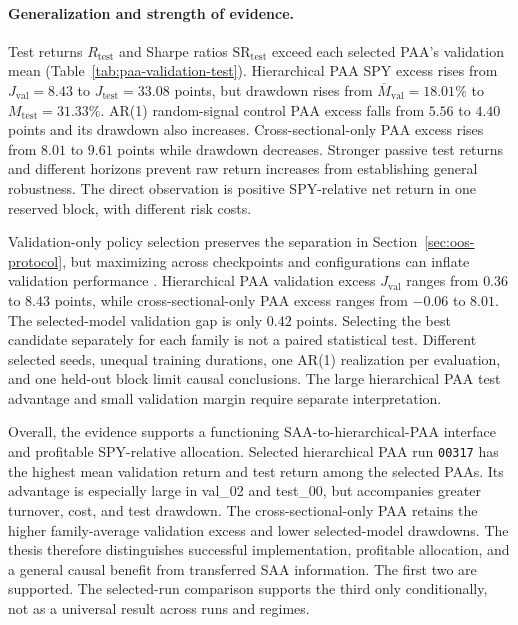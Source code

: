 \paragraph{Generalization and strength of evidence.}
Test returns \(R_{\mathrm{test}}\) and Sharpe ratios \(\mathrm{SR}_{\mathrm{test}}\) exceed each selected PAA's validation mean (Table~\ref{tab:paa-validation-test}). Hierarchical PAA SPY excess rises from \(J_{\mathrm{val}}=8.43\) to \(J_{\mathrm{test}}=33.08\) points, but drawdown rises from \(\overline M_{\mathrm{val}}=18.01\%\) to \(M_{\mathrm{test}}=31.33\%\). AR(1) random-signal control PAA excess falls from \(5.56\) to \(4.40\) points and its drawdown also increases. Cross-sectional-only PAA excess rises from \(8.01\) to \(9.61\) points while drawdown decreases. Stronger passive test returns and different horizons prevent raw return increases from establishing general robustness. The direct observation is positive SPY-relative net return in one reserved block, with different risk costs.

Validation-only policy selection preserves the separation in Section~\ref{sec:oos-protocol}, but maximizing across checkpoints and configurations can inflate validation performance \cite{LopezdePrado.2018}. Hierarchical PAA validation excess \(J_{\mathrm{val}}\) ranges from \(0.36\) to \(8.43\) points, while cross-sectional-only PAA excess ranges from \(-0.06\) to \(8.01\). The selected-model validation gap is only \(0.42\) points. Selecting the best candidate separately for each family is not a paired statistical test. Different selected seeds, unequal training durations, one AR(1) realization per evaluation, and one held-out block limit causal conclusions. The large hierarchical PAA test advantage and small validation margin require separate interpretation.

Overall, the evidence supports a functioning SAA-to-hierarchical-PAA interface and profitable SPY-relative allocation. Selected hierarchical PAA run \texttt{00317} has the highest mean validation return and test return among the selected PAAs. Its advantage is especially large in val\_02 and test\_00, but accompanies greater turnover, cost, and test drawdown. The cross-sectional-only PAA retains the higher family-average validation excess and lower selected-model drawdowns. The thesis therefore distinguishes successful implementation, profitable allocation, and a general causal benefit from transferred SAA information. The first two are supported. The selected-run comparison supports the third only conditionally, not as a universal result across runs and regimes.
